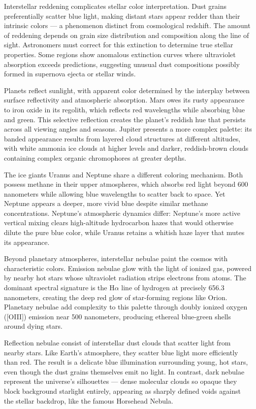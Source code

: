 Interstellar reddening complicates stellar color interpretation. Dust grains preferentially scatter blue light, making distant stars appear redder than their intrinsic colors — a phenomenon distinct from cosmological redshift. The amount of reddening depends on grain size distribution and composition along the line of sight. Astronomers must correct for this extinction to determine true stellar properties. Some regions show anomalous extinction curves where ultraviolet absorption exceeds predictions, suggesting unusual dust compositions possibly formed in supernova ejecta or stellar winds.

Planets reflect sunlight, with apparent color determined by the interplay between surface reflectivity and atmospheric absorption. Mars owes its rusty appearance to iron oxide in its regolith, which reflects red wavelengths while absorbing blue and green. This selective reflection creates the planet's reddish hue that persists across all viewing angles and seasons. Jupiter presents a more complex palette: its banded appearance results from layered cloud structures at different altitudes, with white ammonia ice clouds at higher levels and darker, reddish-brown clouds containing complex organic chromophores at greater depths.

The ice giants Uranus and Neptune share a different coloring mechanism. Both possess methane in their upper atmospheres, which absorbs red light beyond 600 nanometers while allowing blue wavelengths to scatter back to space. Yet Neptune appears a deeper, more vivid blue despite similar methane concentrations. Neptune's atmospheric dynamics differ: Neptune's more active vertical mixing clears high-altitude hydrocarbon hazes that would otherwise dilute the pure blue color, while Uranus retains a whitish haze layer that mutes its appearance.

Beyond planetary atmospheres, interstellar nebulae paint the cosmos with characteristic colors. Emission nebulae glow with the light of ionized gas, powered by nearby hot stars whose ultraviolet radiation strips electrons from atoms. The dominant spectral signature is the H$\alpha$ line of hydrogen at precisely 656.3 nanometers, creating the deep red glow of star-forming regions like Orion. Planetary nebulae add complexity to this palette through doubly ionized oxygen ([OIII]) emission near 500 nanometers, producing ethereal blue-green shells around dying stars.

Reflection nebulae consist of interstellar dust clouds that scatter light from nearby stars. Like Earth's atmosphere, they scatter blue light more efficiently than red. The result is a delicate blue illumination surrounding young, hot stars, even though the dust grains themselves emit no light. In contrast, dark nebulae represent the universe's silhouettes — dense molecular clouds so opaque they block background starlight entirely, appearing as sharply defined voids against the stellar backdrop, like the famous Horsehead Nebula.

